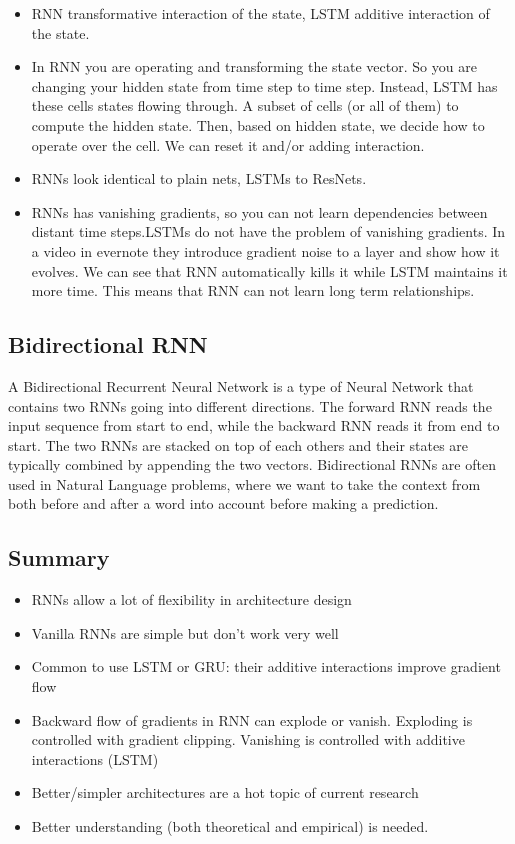 \documentclass{article}
\begin{document}
	\begin{itemize}
		\item RNN transformative interaction of the state, LSTM additive interaction of the state.
		\item In RNN you are operating and transforming the state vector. So you are changing your hidden state from time step to time step. Instead, LSTM has these cells states flowing through. A subset of cells (or all of them) to compute the hidden state. Then, based on hidden state, we decide how to operate over the cell. We can reset it and/or adding interaction.
		\item RNNs look identical to plain nets, LSTMs to ResNets.
		\item RNNs has vanishing gradients, so you can not learn dependencies between distant time steps.LSTMs do not have the problem of vanishing gradients. In a video in evernote they introduce gradient noise to a layer and show how it evolves. We can see that RNN automatically kills it while LSTM maintains it more time. This means that RNN can not learn long term relationships.
	\end{itemize}
	
	\subsection{Bidirectional RNN}
	A Bidirectional Recurrent Neural Network is a type of Neural Network that contains two RNNs going into different directions. The forward RNN reads the input sequence from start to end, while the backward RNN reads it from end to start. The two RNNs are stacked on top of each others and their states are typically combined by appending the two vectors. Bidirectional RNNs are often used in Natural Language problems, where we want to take the context from both before and after a word into account before making a prediction.
	
	
	\subsection{Summary}
	\begin{itemize}
		\item RNNs allow a lot of flexibility in architecture design
		\item Vanilla RNNs are simple but don’t work very well
		\item Common to use LSTM or GRU: their additive interactions improve gradient flow
		\item Backward flow of gradients in RNN can explode or vanish. Exploding is controlled with gradient clipping. Vanishing is controlled with additive interactions (LSTM)
		\item Better/simpler architectures are a hot topic of current research
		\item Better understanding (both theoretical and empirical) is needed.
	\end{itemize}
	
\end{document}
